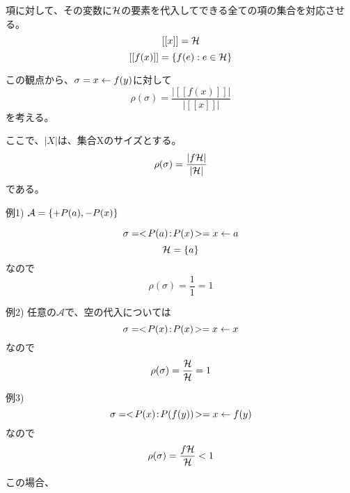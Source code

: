 \documentclass[10pt, oneside]{jarticle}   	%
\begin{document}
項に対して、その変数に$\mathcal{H}$の要素を代入してできる全ての項の集合を対応させる。
$$[[x]] = \mathcal{H}$$
$$[[f(x)]] = \{{f(e) : e \in \mathcal{H}}\}$$

この観点から、$\sigma=x \leftarrow f(y)$に対して$$\rho(\sigma)=\frac{|[[f(x)]]|}{|[[x]]|}$$を考える。

ここで、$|X|$は、集合Xのサイズとする。
$$\rho(\sigma)=\frac{|f\mathcal{H}|}{|\mathcal{H}|}$$
である。

例1)
$\mathcal{A} = \{{+P(a),-P(x)}\}$

$$\sigma=<\!P(a)\!:\!P(x)\!> = x \leftarrow a$$
$$\mathcal{H}=\{{a}\}$$
なので
$$\rho(\sigma)=\frac{1}{1}=1$$

例2)
任意の$\mathcal{A}$で、空の代入については
$$\sigma=<\!P(x)\!:\!P(x)\!> = x \leftarrow x$$
なので
$$\rho(\sigma)=\frac{\mathcal{H}}{\mathcal{H}}=1$$

例3)
$$\sigma=<\!P(x)\!:\!P(f(y))\!> = x \leftarrow f(y)$$
なので
$$\rho(\sigma)=\frac{f\mathcal{H}}{\mathcal{H}} < 1$$

この場合、
\end{document}
